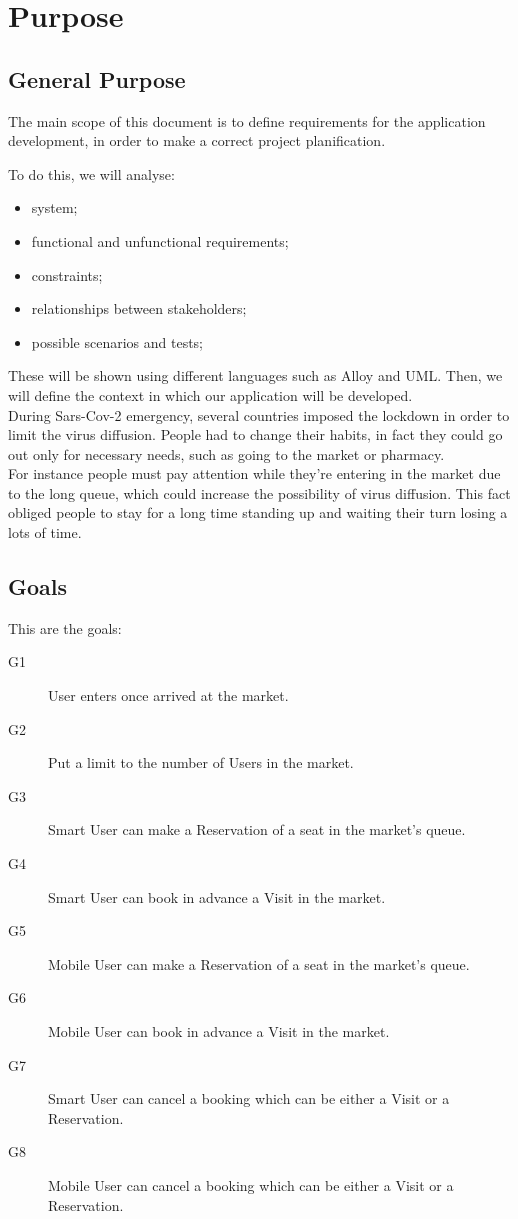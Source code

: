 \section{Purpose}
\subsection{General Purpose}

The main scope of this document is to define requirements for the application development, in order to make a correct project planification.
\par
To do this, we will analyse:

\begin{itemize}
\item system;
\item functional and unfunctional requirements;
\item constraints;
\item relationships between stakeholders;
\item possible scenarios and tests;
\end{itemize}
\bigskip
These will be shown using different languages such as Alloy and UML.
Then, we will define the context in which our application will be developed.\\
During Sars-Cov-2 emergency, several countries imposed the lockdown in order to limit the virus diffusion.
People had to change their habits, in fact they could go out only for necessary needs, such as going to the market or pharmacy.\\
For instance people must pay attention while they're entering in the market due to the long queue, which could increase the possibility of virus diffusion.
This fact obliged people to stay for a long time standing up and waiting their turn losing a lots of time. 
\pagebreak

\subsection{Goals}

This are the goals:

\begin{description}
    \item[G1]User enters once arrived at the market.
    \item[G2]Put a limit to the number of Users in the market.
    \item[G3]Smart User can make a Reservation of a seat in the market's queue.
    \item[G4]Smart User can book in advance a Visit in the market.
    \item[G5]Mobile User can make a Reservation of a seat in the market's queue.
    \item[G6]Mobile User can book in advance a Visit in the market.
    \item[G7]Smart User can cancel a booking which can be either a Visit or a Reservation.
    \item[G8]Mobile User can cancel a booking which can be either a Visit or a Reservation.
\end{description}


